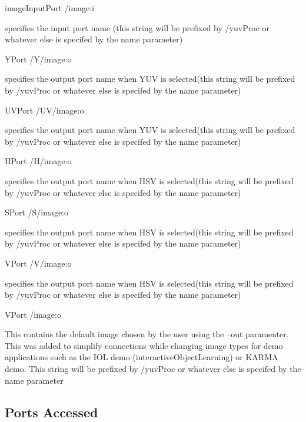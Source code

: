 \begin{DoxyItemize}
\item {\ttfamily image\+Input\+Port} {\ttfamily /image}\+:i ~\newline


specifies the input port name (this string will be prefixed by {\ttfamily /yuv\+Proc} or whatever else is specifed by the name parameter)
\item {\ttfamily Y\+Port} {\ttfamily /\+Y/image}\+:o ~\newline


specifies the output port name when Y\+UV is selected(this string will be prefixed by {\ttfamily /yuv\+Proc} or whatever else is specifed by the name parameter)
\item {\ttfamily U\+V\+Port} {\ttfamily /\+U\+V/image}\+:o ~\newline


specifies the output port name when Y\+UV is selected(this string will be prefixed by {\ttfamily /yuv\+Proc} or whatever else is specifed by the name parameter)
\item {\ttfamily H\+Port} {\ttfamily /\+H/image}\+:o ~\newline


specifies the output port name when H\+SV is selected(this string will be prefixed by {\ttfamily /yuv\+Proc} or whatever else is specifed by the name parameter)
\item {\ttfamily S\+Port} {\ttfamily /\+S/image}\+:o ~\newline


specifies the output port name when H\+SV is selected(this string will be prefixed by {\ttfamily /yuv\+Proc} or whatever else is specifed by the name parameter)
\item {\ttfamily V\+Port} {\ttfamily /\+V/image}\+:o ~\newline


specifies the output port name when H\+SV is selected(this string will be prefixed by {\ttfamily /yuv\+Proc} or whatever else is specifed by the name parameter)
\item {\ttfamily V\+Port} {\ttfamily /image}\+:o ~\newline


This contains the default image chosen by the user using the --out paramenter. This was added to simplify connections while changing image types for demo applications such as the I\+OL demo (interactive\+Object\+Learning) or K\+A\+R\+MA demo. This string will be prefixed by {\ttfamily /yuv\+Proc} or whatever else is specifed by the name parameter
\end{DoxyItemize}\hypertarget{group__lumaChroma_portsa_sec}{}\subsection{Ports Accessed}\label{group__lumaChroma_portsa_sec}

